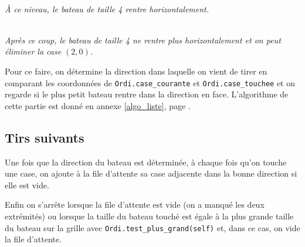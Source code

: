 \begin{center}
\\
\textit{À ce niveau, le bateau de taille 4 rentre horizontalement.}
\end{center}
\begin{center}
\\
\textit{Après ce coup, le bateau de taille 4 ne rentre plus horizontalement et on peut éliminer la case $(2,0)$.}
\end{center}
Pour ce faire, on détermine la direction dans laquelle on vient de tirer en comparant les coordonnées de \texttt{Ordi.case\_courante} et \texttt{Ordi.case\_touchee} et on regarde si le plus petit bateau rentre dans la direction en face. L'algorithme de cette partie est donné en annexe \ref{algo_liste}, page \pageref{update_queue_manque}.


\subsection{Tirs suivants}
Une fois que la direction du bateau est déterminée, à chaque fois qu'on touche une case, on ajoute à la file d'attente sa case adjacente dans la bonne direction si elle est vide.

Enfin on s'arrête lorsque la file d'attente est vide (on a manqué les deux extrémités) ou lorsque la taille du bateau touché est égale à la plus grande taille du bateau sur la grille avec \texttt{Ordi.test\_plus\_grand(self)} et, dans ce cas, on vide la file d'attente. 

